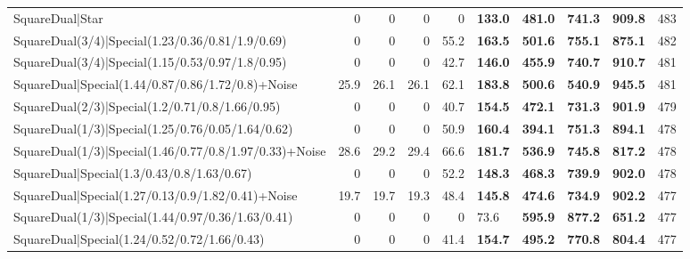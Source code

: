 \begin{tabular}{lrrrrllllr}
 SquareDual|Star                                         &          0   &          0   &          0   &             0   & \textbf{133.0} & \textbf{481.0} & \textbf{741.3} & \textbf{909.8}  &          483 \\
 SquareDual(3/4)|Special(1.23/0.36/0.81/1.9/0.69)        &          0   &          0   &          0   &            55.2 & \textbf{163.5} & \textbf{501.6} & \textbf{755.1} & \textbf{875.1}  &          482 \\
 SquareDual(3/4)|Special(1.15/0.53/0.97/1.8/0.95)        &          0   &          0   &          0   &            42.7 & \textbf{146.0} & \textbf{455.9} & \textbf{740.7} & \textbf{910.7}  &          481 \\
 SquareDual|Special(1.44/0.87/0.86/1.72/0.8)+Noise       &         25.9 &         26.1 &         26.1 &            62.1 & \textbf{183.8} & \textbf{500.6} & \textbf{540.9} & \textbf{945.5}  &          481 \\
 SquareDual(2/3)|Special(1.2/0.71/0.8/1.66/0.95)         &          0   &          0   &          0   &            40.7 & \textbf{154.5} & \textbf{472.1} & \textbf{731.3} & \textbf{901.9}  &          479 \\
 SquareDual(1/3)|Special(1.25/0.76/0.05/1.64/0.62)       &          0   &          0   &          0   &            50.9 & \textbf{160.4} & \textbf{394.1} & \textbf{751.3} & \textbf{894.1}  &          478 \\
 SquareDual(1/3)|Special(1.46/0.77/0.8/1.97/0.33)+Noise  &         28.6 &         29.2 &         29.4 &            66.6 & \textbf{181.7} & \textbf{536.9} & \textbf{745.8} & \textbf{817.2}  &          478 \\
 SquareDual|Special(1.3/0.43/0.8/1.63/0.67)              &          0   &          0   &          0   &            52.2 & \textbf{148.3} & \textbf{468.3} & \textbf{739.9} & \textbf{902.0}  &          478 \\
 SquareDual|Special(1.27/0.13/0.9/1.82/0.41)+Noise       &         19.7 &         19.7 &         19.3 &            48.4 & \textbf{145.8} & \textbf{474.6} & \textbf{734.9} & \textbf{902.2}  &          477 \\
 SquareDual(1/3)|Special(1.44/0.97/0.36/1.63/0.41)       &          0   &          0   &          0   &             0   & 73.6           & \textbf{595.9} & \textbf{877.2} & \textbf{651.2}  &          477 \\
 SquareDual|Special(1.24/0.52/0.72/1.66/0.43)            &          0   &          0   &          0   &            41.4 & \textbf{154.7} & \textbf{495.2} & \textbf{770.8} & \textbf{804.4}  &          477 \\

\end{tabular}
